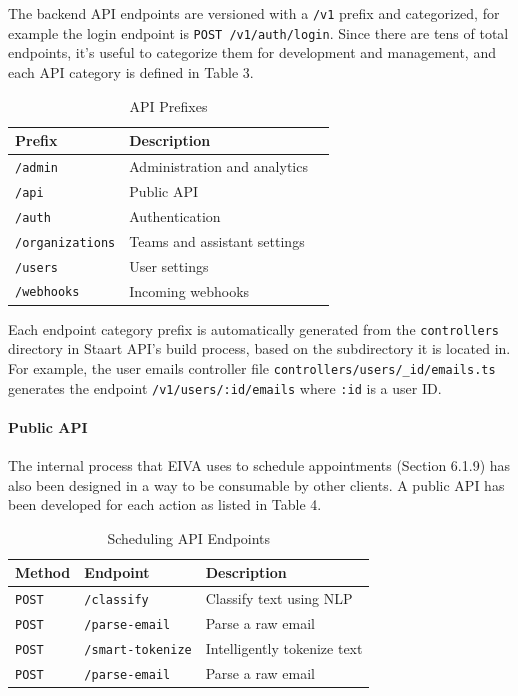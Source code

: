 \documentclass{article}
\begin{document}
The backend API endpoints are versioned with a \texttt{/v1} prefix and categorized, for example the login endpoint is \texttt{POST /v1/auth/login}.  Since there are tens of total endpoints, it's useful to categorize them for development and management, and each API category is defined in Table 3.

\begin{table}[!htb]
	\begin{minipage}{1\linewidth}
		\caption{API Prefixes}
		\centering
		\begin{tabular}{lll}
			\hline
			\textbf{Prefix} & \textbf{Description} \\
			\hline
			\texttt{/admin} & Administration and analytics \\
			\texttt{/api} & Public API \\
			\texttt{/auth} & Authentication \\
			\texttt{/organizations} & Teams and assistant settings \\
			\texttt{/users} & User settings \\
			\texttt{/webhooks} & Incoming webhooks \\
			\hline
		\end{tabular}
	\end{minipage}%
\end{table}

Each endpoint category prefix is automatically generated from the \texttt{controllers} directory in Staart API's build process, based on the subdirectory it is located in. For example, the user emails controller file \texttt{controllers/users/\_id/emails.ts} generates the endpoint \texttt{/v1/users/:id/emails} where \texttt{:id} is a user ID.

\paragraph{Public API}

The internal process that EIVA uses to schedule appointments (Section 6.1.9) has also been designed in a way to be consumable by other clients. A public API has been developed for each action as listed in Table 4.

\begin{table}[!htb]
	\begin{minipage}{1\linewidth}
		\caption{Scheduling API Endpoints}
		\centering
		\begin{tabular}{lll}
			\hline
			\textbf{Method} & \textbf{Endpoint} & \textbf{Description} \\
			\hline
			\texttt{POST} & \texttt{/classify} & Classify text using NLP \\
			\texttt{POST} & \texttt{/parse-email} & Parse a raw email \\
			\texttt{POST} & \texttt{/smart-tokenize} & Intelligently tokenize text \\
			\texttt{POST} & \texttt{/parse-email} & Parse a raw email \\
			\hline
		\end{tabular}
	\end{minipage}%
\end{table}
\end{document}
